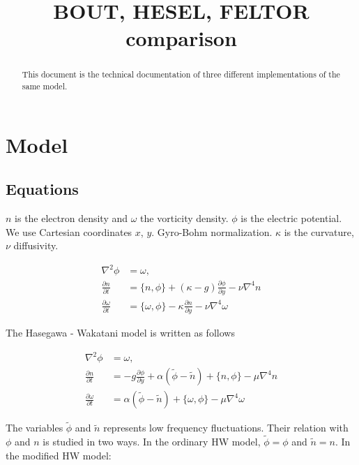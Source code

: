 \documentclass{hitec} %
\begin{document}
\title{BOUT, HESEL, FELTOR comparison}
\maketitle

\begin{abstract}
This document is the technical documentation of three different implementations of the same model.
\end{abstract}

\section{Model}
\subsection{Equations}
 $n$ is the electron density and $\omega$
the vorticity density. $\phi$ is the electric potential. We
use Cartesian coordinates $x$, $y$. Gyro-Bohm normalization. $\kappa$ is
the curvature, $\nu$ diffusivity.

\begin{subequations}
\begin{align}
 \nabla^2 \phi & =  \omega, \quad \\
 \frac{\partial n}{\partial t}    & =
    \{ n, \phi\}
  + (\kappa - g) \frac{\partial \phi}{\partial y}
  - \nu \nabla^4 n  \\
  \frac{\partial \omega}{\partial t} & =
  \{ \omega, \phi\}
  - \kappa\frac{\partial n}{\partial y} -\nu\nabla^4\omega
\end{align}
\end{subequations}

The Hasegawa - Wakatani model is written as follows

\begin{subequations}
\begin{align}
 \nabla^2 \phi & =  \omega, \quad \\
 \frac{\partial n}{\partial t}     & =  - g \frac{\partial \phi}{\partial y} + \alpha (\tilde{\phi} - \tilde{n})
 + \{n, \phi\} - \mu \nabla^4 n \\
  \frac{\partial \omega}{\partial t} & =  \alpha ( \tilde{\phi} - \tilde{n}) + \{ \omega, \phi\}
- \mu\nabla^4\omega
\end{align}
\end{subequations}

The variables $\tilde{\phi}$ and $\tilde{n}$ represents low frequency fluctuations. Their relation with $\phi$ and $n$ is studied in two ways. In the ordinary HW model, $\tilde{\phi} = \phi$ and $\tilde{n} = n$. In the modified HW model:
\end{document}
